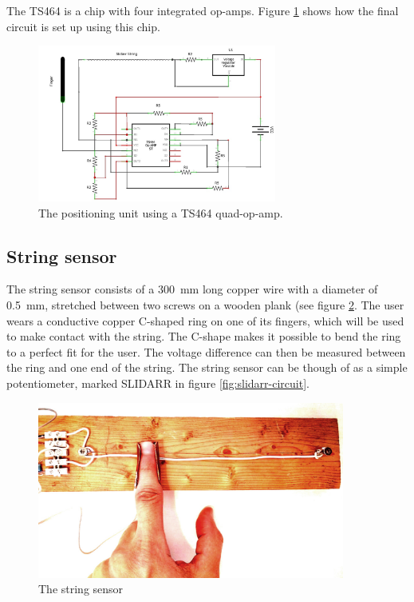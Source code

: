 \documentclass{article}
\begin{document}
The TS464 is a chip with four integrated op-amps. Figure \ref{fig:slidarr-circuit2} shows how the final circuit is set up using this chip.

\begin{figure}[ht]
  \centering
  \includegraphics[width=0.7\textwidth]{slidarr-circuit2}
  \caption{The positioning unit using a TS464 quad-op-amp.}
  \label{fig:slidarr-circuit2}
\end{figure}

\subsection{String sensor}
The string sensor consists of a \SI{300}{\milli\meter} long copper wire with a diameter of \SI{0.5}{\milli\meter}, stretched between two screws on a wooden plank (see figure \ref{fig:string_sensor}.  The user wears a conductive copper C-shaped ring on one of its fingers, which will be used to make contact with the string. The C-shape makes it possible to bend the ring to a perfect fit for the user. The voltage difference can then be measured between the ring and one end of the string. The string sensor can be though of as a simple potentiometer, marked SLIDARR in figure \ref{fig:slidarr-circuit}.

\begin{figure}[ht]
  \centering
  \includegraphics[width=0.9\textwidth]{string-sensor}
  \caption{The string sensor}
  \label{fig:string_sensor}
\end{figure}
\end{document}
